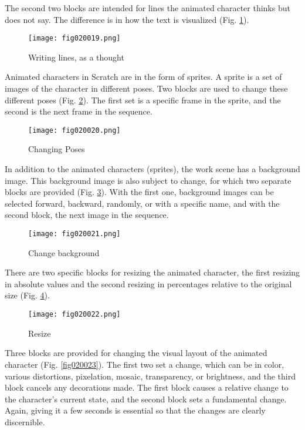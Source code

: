 The second two blocks are intended for lines the animated character thinks but does not say. The difference is in how the text is visualized (Fig. \ref{fig020019}).

\begin{figure}[H]
   \centering
   \texttt{[image: fig020019.png]}
   \caption{Writing lines, as a thought}
\label{fig020019}
\end{figure}

Animated characters in Scratch are in the form of sprites. A sprite is a set of images of the character in different poses. Two blocks are used to change these different poses (Fig. \ref{fig020020}). The first set is a specific frame in the sprite, and the second is the next frame in the sequence.

\begin{figure}[H]
   \centering
   \texttt{[image: fig020020.png]}
   \caption{Changing Poses}
\label{fig020020}
\end{figure}

In addition to the animated characters (sprites), the work scene has a background image. This background image is also subject to change, for which two separate blocks are provided (Fig. \ref{fig020021}). With the first one, background images can be selected forward, backward, randomly, or with a specific name, and with the second block, the next image in the sequence.

\begin{figure}[H]
   \centering
   \texttt{[image: fig020021.png]}
   \caption{Change background}
\label{fig020021}
\end{figure}

There are two specific blocks for resizing the animated character, the first resizing in absolute values and the second resizing in percentages relative to the original size (Fig. \ref{fig020022}).

\begin{figure}[H]
   \centering
   \texttt{[image: fig020022.png]}
   \caption{Resize}
\label{fig020022}
\end{figure}

Three blocks are provided for changing the visual layout of the animated character (Fig. \ref{fig020023}). The first two set a change, which can be in color, various distortions, pixelation, mosaic, transparency, or brightness, and the third block cancels any decorations made. The first block causes a relative change to the character's current state, and the second block sets a fundamental change. Again, giving it a few seconds is essential so that the changes are clearly discernible.

